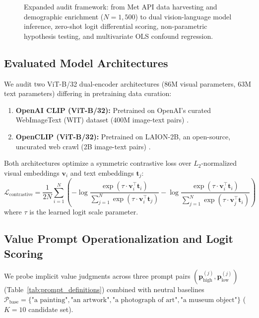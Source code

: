 \documentclass[pdflatex,sn-mathphys-num]{sn-jnl}%
\theoremstyle{thmstyleone}%
\theoremstyle{thmstyletwo}%
\theoremstyle{thmstylethree}%
\begin{document}
\begin{figure}[t]
\caption{Expanded audit framework: from Met API data harvesting and demographic enrichment ($N=1,500$) to dual vision-language model inference, zero-shot logit differential scoring, non-parametric hypothesis testing, and multivariate OLS confound regression.}
\label{fig:audit_framework_expanded}
\end{figure}

\subsection{Evaluated Model Architectures}
We audit two ViT-B/32 dual-encoder architectures ($86\text{M}$ visual parameters, $63\text{M}$ text parameters) differing in pretraining data curation:
\begin{enumerate}
    \item \textbf{OpenAI CLIP (ViT-B/32):} Pretrained on OpenAI's curated WebImageText (WIT) dataset (400M image-text pairs) \cite{radford2021learning}.
    \item \textbf{OpenCLIP (ViT-B/32):} Pretrained on LAION-2B, an open-source, uncurated web crawl (2B image-text pairs) \cite{cherti2023reproducible, schuhmann2022laion}.
\end{enumerate}
Both architectures optimize a symmetric contrastive loss over $L_2$-normalized visual embeddings $\mathbf{v}_i$ and text embeddings $\mathbf{t}_j$:
\begin{equation}
\mathcal{L}_{\text{contrastive}} = \frac{1}{2N} \sum_{i=1}^{N} \left( -\log \frac{\exp(\tau \cdot \mathbf{v}_i^\top \mathbf{t}_i)}{\sum_{j=1}^{N} \exp(\tau \cdot \mathbf{v}_i^\top \mathbf{t}_j)} - \log \frac{\exp(\tau \cdot \mathbf{v}_i^\top \mathbf{t}_i)}{\sum_{j=1}^{N} \exp(\tau \cdot \mathbf{v}_j^\top \mathbf{t}_i)} \right)
\end{equation}
where $\tau$ is the learned logit scale parameter.

\subsection{Value Prompt Operationalization and Logit Scoring}
We probe implicit value judgments across three prompt pairs $(\mathbf{p}_{\text{high}}^{(j)}, \mathbf{p}_{\text{low}}^{(j)})$ (Table~\ref{tab:prompt_definitions}) combined with neutral baselines $\mathcal{P}_{\text{base}} = \{\text{"a painting"}, \text{"an artwork"}, \text{"a photograph of art"}, \text{"a museum object"}\}$ ($K=10$ candidate set).
\end{document}
